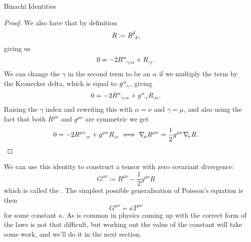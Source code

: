 \documentclass[fleqn]{NotesClass}
\newcommand*{\covariantDerivative}[1]{\nabla_{\!#1}}
\begin{document}
\begin{lma}{Binachi Identities}{}
\begin{proof}
            We also have that by definition
            \begin{equation}
                R \coloneqq \tensor{R}{^\delta_\delta},
            \end{equation}
            giving us
            \begin{equation}
                0 = -2\tensor{R}{^\alpha_{\gamma;\alpha}} + \tensor{R}{_{;\gamma}}.
            \end{equation}
            We can change the \(\gamma\) in the second term to be an \(\alpha\) if we multiply the term by the Kronecker delta, which is equal to \(\tensor{g}{^\alpha_\gamma}\), giving
            \begin{equation}
                0 = -2\tensor{R}{^\alpha_{\gamma;\alpha}} + \tensor{g}{^\alpha_\gamma}\tensor{R}{_{;\alpha}}.
            \end{equation}
            Raising the \(\gamma\) index and rewriting this with \(\alpha = \nu\) and \(\gamma = \mu\), and also using the fact that both \(R^{\mu\nu}\) and \(g^{\mu\nu}\) are symmetric we get
            \begin{equation}
                0 = -2\tensor{R}{^{\mu\nu}_{;\nu}} + \tensor{g}{^{\mu\nu}} \tensor{R}{_{;\nu}} \iff \covariantDerivative{\mu}R^{\mu\nu} = \frac{1}{2}g^{\mu\nu}\covariantDerivative{\nu}R.
            \end{equation}
        \end{proof}
    \end{lma}
    
    We can use this identity to construct a tensor with zero covariant divergence:
    \begin{equation}
        G^{\mu\nu} \coloneqq R^{\mu\nu} - \frac{1}{2}g^{\mu\nu} R
    \end{equation}
    which is called the .
    The simplest possible generalisation of Poisson's equation is then
    \begin{equation}
        G^{\mu\nu} = \kappa T^{\mu\nu}
    \end{equation}
    for some constant \(\kappa\).
    As is common in physics coming up with the correct form of the laws is not that difficult, but working out the value of the constant will take some work, and we'll do it in the next section.
    
\end{document}
